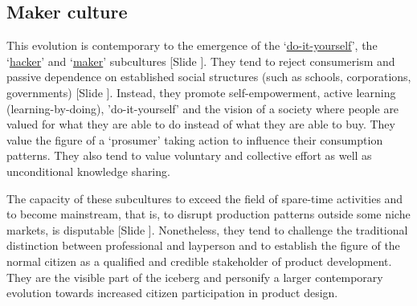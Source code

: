 \documentclass{article}
\newcounter{slide}
\begin{document}
\subsection{Maker culture}
\label{sec:Maker culture}
This evolution is contemporary to the emergence of the `\href{https://en.wikipedia.org/wiki/DIY_ethic}{do-it-yourself}', the `\href{https://en.wikipedia.org/wiki/Hacker_culture}{hacker}' and `\href{https://en.wikipedia.org/wiki/Maker_culture}{maker}' subcultures {\color{blue}[Slide ]}. They tend to reject consumerism and passive dependence on established social structures (such as schools, corporations, governments) {\color{blue}[Slide ]}. Instead, they promote self-empowerment, active learning (learning-by-doing), 'do-it-yourself' and the vision of a society where people are valued for what they are able to do instead of what they are able to buy. They value the figure of a `prosumer' taking action to influence their consumption patterns. They also tend to value voluntary and collective effort as well as unconditional knowledge sharing.

The capacity of these subcultures to exceed the field of spare-time activities and to become mainstream, that is, to disrupt production patterns outside some niche markets, is disputable {\color{blue}[Slide ]}. Nonetheless, they tend to challenge the traditional distinction between professional and layperson and to establish the figure of the normal citizen as a qualified and credible stakeholder of product development. They are the visible part of the iceberg and personify a larger contemporary evolution towards increased citizen participation in product design. 

\begin{comment}
In the following sections, we will review two trends taking advantage of the creative force of individual citizens in NPD processes:
\begin{itemize}
	\item \emph{Crowdsourcing} is a firm-centered concept and is about outsourcing part of the product development process to the public in order to reduce R\&D costs, generate more original product ideas or improve the company's image. 
	\item \emph{Open Source Hardware} is a community-centered concept and is about developing freely replicable products in open and collaborative processes, using the same principles than open source software. 
\end{itemize}
\end{comment}
\end{document}
